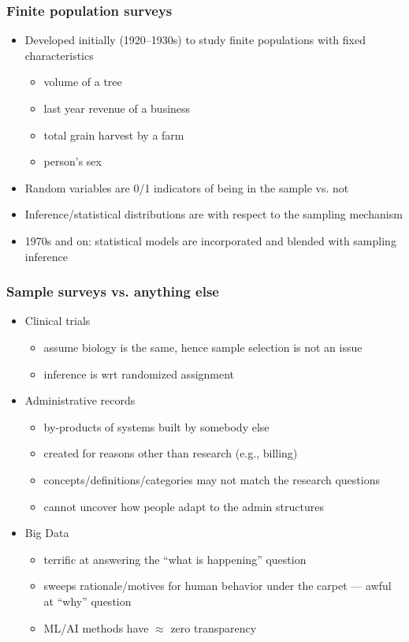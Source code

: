 \documentclass{beamer}
\begin{document}
\begin{frame}\frametitle{Finite population surveys}

\begin{itemize}
    \item Developed initially (1920--1930s) to study finite populations with fixed characteristics
        \begin{itemize}
            \item volume of a tree
            \item last year revenue of a business
            \item total grain harvest by a farm
            \item person's sex
        \end{itemize}
    \item Random variables are 0/1 indicators of being in the sample vs. not
    \item Inference/statistical distributions are with respect to the sampling mechanism
    \item 1970s and on: statistical models are incorporated and blended with sampling inference
\end{itemize}

\end{frame}

\begin{frame}\frametitle{Sample surveys vs. anything else}

\begin{itemize}
    \item Clinical trials
        \begin{itemize}
            \item assume biology is the same, hence sample selection is not an issue
            \item inference is wrt randomized assignment
        \end{itemize}
    \item Administrative records
        \begin{itemize}
            \item by-products of systems built by somebody else
            \item created for reasons other than research (e.g., billing)
            \item concepts/definitions/categories may not match the research questions
            \item cannot uncover how people adapt to the admin structures
        \end{itemize}
    \item Big Data
        \begin{itemize}
            \item terrific at answering the ``what is happening'' question
            \item sweeps rationale/motives for human behavior under the carpet --- awful at ``why'' question
            \item ML/AI methods have $\approx$ zero transparency
        \end{itemize}
\end{itemize}

\end{frame}
\end{document}
